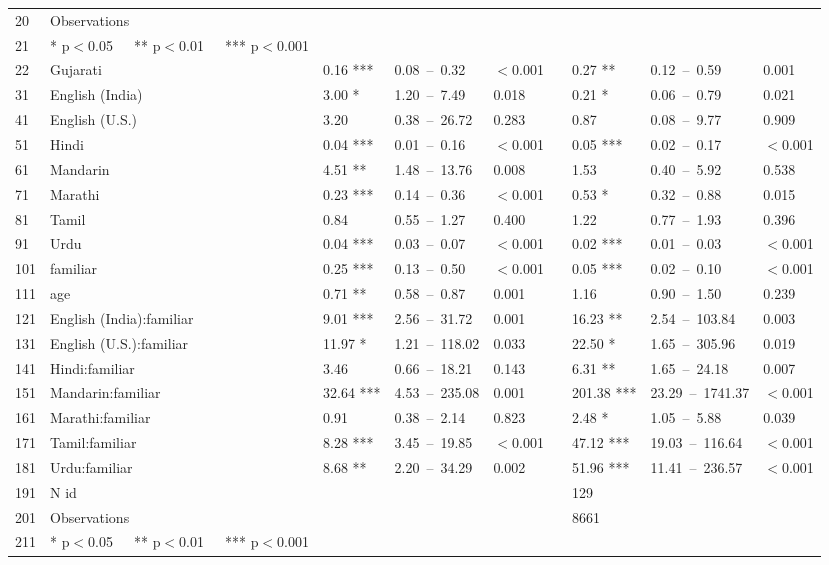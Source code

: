 \begin{table}[ht]
\begin{tabular}{}
  20 & Observations &  &  &  &  &  &  &  \\ 
  21 & * p$<$0.05   ** p$<$0.01   *** p$<$0.001 &  &  &  &  &  &  &  \\ 
  22 & Gujarati & 0.16 *** & 0.08 – 0.32 & $<$0.001 &  & 0.27 ** & 0.12 – 0.59 & 0.001 \\ 
  31 & English (India) & 3.00 * & 1.20 – 7.49 & 0.018 &  & 0.21 * & 0.06 – 0.79 & 0.021 \\ 
  41 & English (U.S.) & 3.20 & 0.38 – 26.72 & 0.283 &  & 0.87 & 0.08 – 9.77 & 0.909 \\ 
  51 & Hindi & 0.04 *** & 0.01 – 0.16 & $<$0.001 &  & 0.05 *** & 0.02 – 0.17 & $<$0.001 \\ 
  61 & Mandarin & 4.51 ** & 1.48 – 13.76 & 0.008 &  & 1.53 & 0.40 – 5.92 & 0.538 \\ 
  71 & Marathi & 0.23 *** & 0.14 – 0.36 & $<$0.001 &  & 0.53 * & 0.32 – 0.88 & 0.015 \\ 
  81 & Tamil & 0.84 & 0.55 – 1.27 & 0.400 &  & 1.22 & 0.77 – 1.93 & 0.396 \\ 
  91 & Urdu & 0.04 *** & 0.03 – 0.07 & $<$0.001 &  & 0.02 *** & 0.01 – 0.03 & $<$0.001 \\ 
  101 & familiar & 0.25 *** & 0.13 – 0.50 & $<$0.001 &  & 0.05 *** & 0.02 – 0.10 & $<$0.001 \\ 
  111 & age & 0.71 ** & 0.58 – 0.87 & 0.001 &  & 1.16 & 0.90 – 1.50 & 0.239 \\ 
  121 & English (India):familiar & 9.01 *** & 2.56 – 31.72 & 0.001 &  & 16.23 ** & 2.54 – 103.84 & 0.003 \\ 
  131 & English (U.S.):familiar & 11.97 * & 1.21 – 118.02 & 0.033 &  & 22.50 * & 1.65 – 305.96 & 0.019 \\ 
  141 & Hindi:familiar & 3.46 & 0.66 – 18.21 & 0.143 &  & 6.31 ** & 1.65 – 24.18 & 0.007 \\ 
  151 & Mandarin:familiar & 32.64 *** & 4.53 – 235.08 & 0.001 &  & 201.38 *** & 23.29 – 1741.37 & $<$0.001 \\ 
  161 & Marathi:familiar & 0.91 & 0.38 – 2.14 & 0.823 &  & 2.48 * & 1.05 – 5.88 & 0.039 \\ 
  171 & Tamil:familiar & 8.28 *** & 3.45 – 19.85 & $<$0.001 &  & 47.12 *** & 19.03 – 116.64 & $<$0.001 \\ 
  181 & Urdu:familiar & 8.68 ** & 2.20 – 34.29 & 0.002 &  & 51.96 *** & 11.41 – 236.57 & $<$0.001 \\ 
  191 & N id &  &  &  &  & 129 &  &  \\ 
  201 & Observations &  &  &  &  & 8661 &  &  \\ 
  211 & * p$<$0.05   ** p$<$0.01   *** p$<$0.001 &  &  &  &  &  &  &  \\ 
   \hline
\end{tabular}
\end{table}
